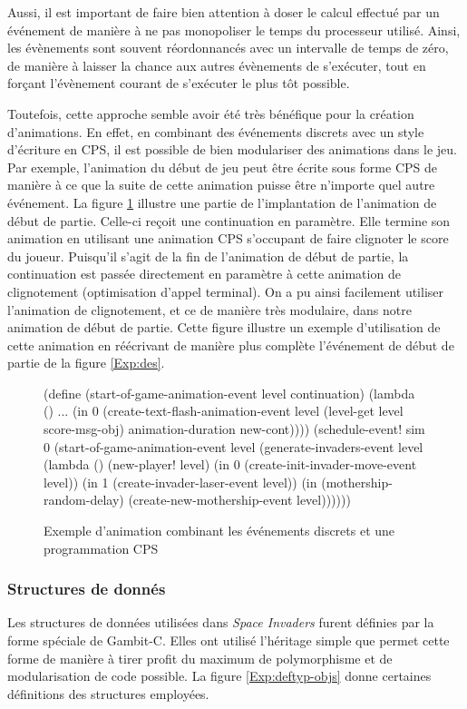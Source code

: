 \documentclass[12pt,twoside,letterpaper,francais]{book}
\newcommand{\si}{{\textit{Space Invaders }}}
\newcommand{\scheme}[1]{\selectlanguage{english}{\tt #1}\selectlanguage{french}}
\begin{document}
Aussi, il est important de faire bien attention à doser le calcul
effectué par un événement de manière à ne pas monopoliser le temps du
processeur utilisé. Ainsi, les évènements sont souvent réordonnancés
avec un intervalle de temps de zéro, de manière à laisser la chance
aux autres évènements de s'exécuter, tout en forçant l'évènement
courant de s'exécuter le plus tôt possible.

Toutefois, cette approche semble avoir été très bénéfique pour la
création d'animations. En effet, en combinant des événements discrets
avec un style d'écriture en CPS, il est possible de bien modulariser
des animations dans le jeu. Par exemple, l'animation du début de jeu
peut être écrite sous forme CPS de manière à ce que la suite de cette
animation puisse être n'importe quel autre événement. La figure
\ref{Exp:anim} illustre une partie de l'implantation de l'animation de
début de partie. Celle-ci reçoit une continuation en paramètre. Elle
termine son animation en utilisant une animation CPS s'occupant de
faire clignoter le score du joueur. Puisqu'il s'agit de la fin de
l'animation de début de partie, la continuation est passée directement
en paramètre à cette animation de clignotement (optimisation d'appel
terminal). On a pu ainsi facilement utiliser l'animation de
clignotement, et ce de manière très modulaire, dans notre animation de
début de partie. Cette figure illustre un exemple d'utilisation de
cette animation en réécrivant de manière plus complète l'événement de
début de partie de la figure \ref{Exp:des}.\\

\begin{figure}[htb!]
  \begin{schemecode}
(define (start-of-game-animation-event level continuation)
  (lambda ()
    ...
    (in 0 (create-text-flash-animation-event level
            (level-get level score-msg-obj)
            animation-duration new-cont))))
(schedule-event! sim 0
  (start-of-game-animation-event level
    (generate-invaders-event level
      (lambda ()
        (new-player! level)
        (in 0 (create-init-invader-move-event level))
        (in 1 (create-invader-laser-event level))
        (in (mothership-random-delay)
            (create-new-mothership-event level))))))
  \end{schemecode}
  \caption{Exemple d'animation combinant les événements discrets et
    une programmation CPS}
  \label{Exp:anim}
\end{figure}


\FloatBarrier
\subsubsection{Structures de donnés}
Les structures de données utilisées dans \si furent définies par la
forme spéciale \scheme{define-type} de Gambit-C. Elles ont utilisé
l'héritage simple que permet cette forme de manière à tirer profit du
maximum de polymorphisme et de modularisation de code possible. La
figure \ref{Exp:deftyp-objs} donne certaines définitions des
structures employées.\\
\end{document}
